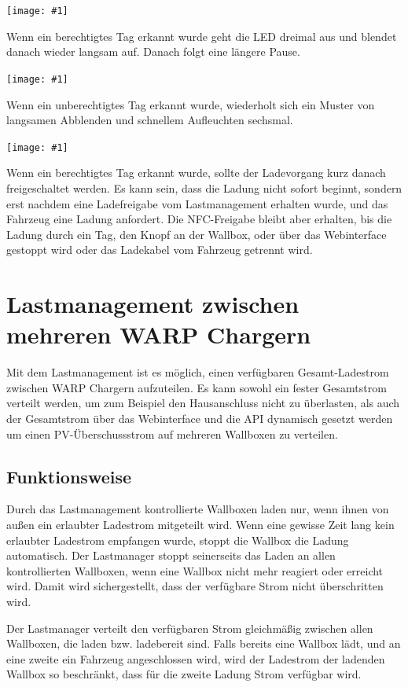 \documentclass[a4paper,10pt]{article}
\newcommand{\gfx}[1]{\texttt{[image: \#1]}}
\begin{document}
\begin{multicols*}{2}
	\gfx{./img_warp2/resized/blink_nag}

	Wenn ein berechtigtes Tag erkannt wurde geht die LED
	dreimal aus und blendet danach wieder langsam auf. Danach folgt eine längere Pause.

	\gfx{./img_warp2/resized/blink_ack}

	Wenn ein unberechtigtes Tag erkannt wurde, wiederholt sich ein Muster von langsamen Abblenden
	und schnellem Aufleuchten sechsmal.

	\gfx{./img_warp2/resized/blink_nack}

	Wenn ein berechtigtes Tag erkannt wurde, sollte der Ladevorgang kurz danach
	freigeschaltet werden. Es kann sein, dass die Ladung nicht
	sofort beginnt, sondern erst nachdem eine Ladefreigabe vom Lastmanagement erhalten wurde,
	und das Fahrzeug eine Ladung anfordert. Die NFC-Freigabe bleibt aber erhalten,
	bis die Ladung durch ein Tag, den Knopf an der Wallbox, oder über das Webinterface gestoppt wird
	oder das Ladekabel vom Fahrzeug getrennt wird.

	\newpage
	\section{Lastmanagement zwischen mehreren WARP Chargern}\label{charge_manager}
	Mit dem Lastmanagement ist es möglich, einen verfügbaren Gesamt-Ladestrom zwischen WARP Chargern aufzuteilen.
	Es kann sowohl ein fester Gesamtstrom verteilt werden, um zum Beispiel den Hausanschluss nicht zu überlasten,
	als auch der Gesamtstrom über das Webinterface und die API dynamisch gesetzt werden
	um einen PV-Überschussstrom auf mehreren Wallboxen zu verteilen.

	\subsection{Funktionsweise}
	Durch das Lastmanagement kontrollierte Wallboxen laden nur,
	wenn ihnen von außen ein erlaubter Ladestrom mitgeteilt wird. Wenn eine gewisse Zeit lang
	kein erlaubter Ladestrom empfangen wurde, stoppt die Wallbox die Ladung automatisch.
	Der Lastmanager stoppt seinerseits das Laden an allen kontrollierten Wallboxen,
	wenn eine Wallbox nicht mehr reagiert oder erreicht wird. Damit wird sichergestellt,
	dass der verfügbare Strom nicht überschritten wird.

	Der Lastmanager verteilt den verfügbaren Strom gleichmäßig zwischen allen Wallboxen, die laden bzw. ladebereit sind.
	Falls bereits eine Wallbox lädt, und an eine zweite ein Fahrzeug angeschlossen wird,
	wird der Ladestrom der ladenden Wallbox so beschränkt, dass für die zweite Ladung Strom verfügbar wird.


\end{multicols*}
\end{document}

